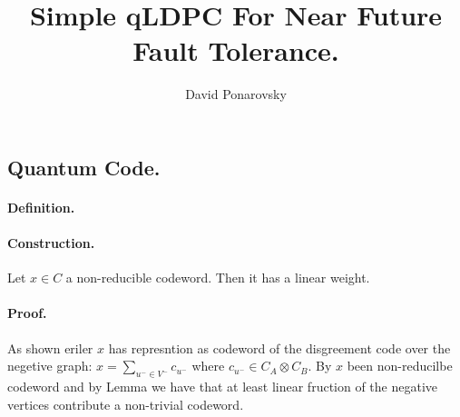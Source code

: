 

\title{Simple qLDPC For Near Future Fault Tolerance. } 
\author{David Ponarovsky}
\maketitle
{} 
\begin{multicols*}{2}
  \section{Quantum Code.}
  \paragraph{Definition.}  
  \paragraph{Construction.}  Let $x \in C$ a non-reducible codeword. Then it has a linear weight. 
  \paragraph{Proof.} As shown eriler $x$ has represntion as codeword of the disgreement code over the negetive graph: $x = \sum_{u^{-} \in V^{-}}{c_{u^{-}}}$ where $c_{u^{-}} \in C_{A}\otimes C_{B}$. By $x$ been non-reducilbe codeword and by Lemma  we have that at least linear fruction of the negative vertices contribute a non-trivial codeword.     



\end{multicols*}
